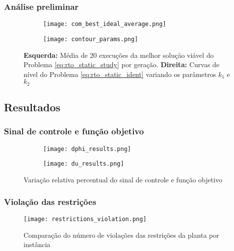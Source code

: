\documentclass{beamer}
\begin{document}
\begin{frame}
	\frametitle{Análise preliminar}
	\begin{figure}
		\centering
		\begin{subfigure}[htb]{0.5\textwidth}
			\centering
			\texttt{[image: com\_best\_ideal\_average.png]}
			\label{fig:com_best_ideal_average}
		\end{subfigure}\hfill
		\begin{subfigure}[htb]{0.5\textwidth}
			\centering
			\texttt{[image: contour\_params.png]}
			\label{fig:contour_params}
		\end{subfigure}
		\caption{\textbf{Esquerda:} Média de 20 execuções da melhor solução viável do Problema \ref{eq:rto_static_study} por geração. \textbf{Direita:} Curvas de nível do Problema \ref{eq:rto_static_ident} variando os parâmetros $k_1$ e $k_2$}
		\label{fig:algo_results}
	\end{figure}


\end{frame}




\subsection{Resultados}
\begin{frame}
	\frametitle{Sinal de controle e função objetivo}
	\begin{figure}
		\centering
		\begin{subfigure}[b]{0.5\textwidth}
			\centering
			\texttt{[image: dphi\_results.png]}
			\label{fig:dphi_results}
		\end{subfigure}\hfill
		\begin{subfigure}[b]{0.5\textwidth}
			\centering
			\texttt{[image: du\_results.png]}
			\label{fig:du_results}
		\end{subfigure}
		\caption{Variação relativa percentual do sinal de controle e função objetivo}
		\label{fig:results_kpis}
	\end{figure}
\end{frame}


\begin{frame}
	\frametitle{Violação das restrições}
	\begin{figure}
		\centering
		\texttt{[image: restrictions\_violation.png]}
		\caption{Comparação do número de violações das restrições da planta por instância}
		\label{fig:restrictions_violation}
	\end{figure}
\end{frame}
\end{document}
